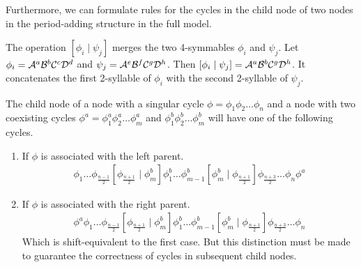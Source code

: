 Furthermore, we can formulate rules for the cycles in the child node of two nodes in the period-adding structure in the full model.

\begin{definition}
    The operation $\left[\phi_i \mid \psi_j\right]$ merges the two 4-symmables $\phi_i$ and $\psi_j$.
    Let $\phi_i = \mathcal{A}^a\mathcal{B}^b\mathcal{C}^c\mathcal{D}^d$ and $\psi_j = \mathcal{A}^e\mathcal{B}^f\mathcal{C}^g\mathcal{D}^h$.
    Then $\left[\phi_i \mid \psi_j\right] = \mathcal{A}^a\mathcal{B}^b\mathcal{C}^g\mathcal{D}^h$.
    It concatenates the first 2-syllable of $\phi_i$ with the second 2-syllable of $\psi_j$.
\end{definition}

\begin{theorem}
    The child node of a node with a singular cycle $\phi = \phi_1\phi_2 \dots \phi_n$ and a node with two coexisting cycles $\phi^a = \phi^a_1\phi^a_2 \dots \phi^a_m$ and $\phi^b_1\phi^b_2 \dots \phi^b_m$ will have one of the following cycles.
    \begin{enumerate}
        \item If $\phi$ is associated with the left parent.
              \begin{align*}
                  \phi_1 \dots \phi_{\frac{n-1}{2}} \left[\phi_{\frac{n+1}{2}} \mid \phi^b_m\right]
                  \phi^b_1 \dots \phi^b_{m-1} \left[\phi^b_m \mid \phi_{\frac{n+1}{2}}\right]
                  \phi_{\frac{n+3}{2}} \dots \phi_n \phi^a
              \end{align*}
        \item If $\phi$ is associated with the right parent.
              \begin{align*}
                  \phi^a \phi_1 \dots \phi_{\frac{n-1}{2}} \left[\phi_{\frac{n+1}{2}} \mid \phi^b_m\right]
                  \phi^b_1 \dots \phi^b_{m-1} \left[\phi^b_m \mid \phi_{\frac{n+1}{2}}\right]
                  \phi_{\frac{n+3}{2}} \dots \phi_n
              \end{align*}
              Which is shift-equivalent to the first case.
              But this distinction must be made to guarantee the correctness of cycles in subsequent child nodes.
    \end{enumerate}
\end{theorem}

